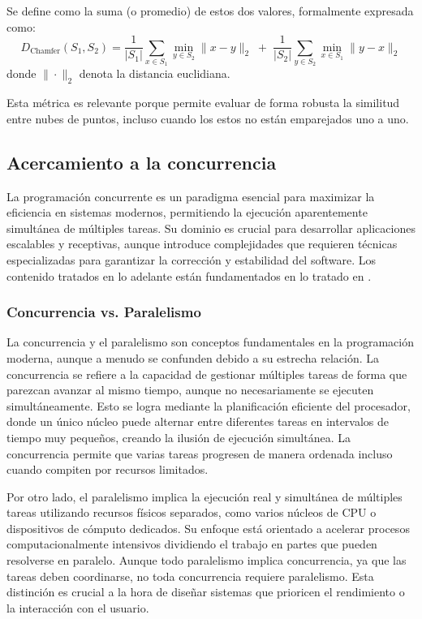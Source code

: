 Se define como la suma (o promedio) de estos dos valores, formalmente expresada como:
\[
D_{\mathrm{Chamfer}}(S_1, S_2) = \frac{1}{|S_1|} \sum_{x \in S_1} \min_{y \in S_2} \|x - y\|_2 \;+\; \frac{1}{|S_2|} \sum_{y \in S_2} \min_{x \in S_1} \|y - x\|_2
\]
donde \(\|\cdot\|_2\) denota la distancia euclidiana.

Esta métrica es relevante porque permite evaluar de forma robusta la similitud entre nubes de puntos, incluso cuando los estos no están emparejados uno a uno. 

\subsection{Acercamiento a la concurrencia}
La programación concurrente es un paradigma esencial para maximizar la eficiencia en sistemas modernos, permitiendo la ejecución aparentemente simultánea de múltiples tareas. Su dominio es crucial para desarrollar aplicaciones escalables y receptivas, aunque introduce complejidades que requieren técnicas especializadas para garantizar la corrección y estabilidad del software. Los contenido tratados en lo adelante están fundamentados en lo tratado en \cite{tanenbaum2008modern}.

\subsubsection{Concurrencia vs. Paralelismo}
La concurrencia y el paralelismo son conceptos fundamentales en la programación moderna, aunque a menudo se confunden debido a su estrecha relación. La concurrencia se refiere a la capacidad de gestionar múltiples tareas de forma que parezcan avanzar al mismo tiempo, aunque no necesariamente se ejecuten simultáneamente. Esto se logra mediante la planificación eficiente del procesador, donde un único núcleo puede alternar entre diferentes tareas en intervalos de tiempo muy pequeños, creando la ilusión de ejecución simultánea. La concurrencia permite que varias tareas progresen de manera ordenada incluso cuando compiten por recursos limitados.

Por otro lado, el paralelismo implica la ejecución real y simultánea de múltiples tareas utilizando recursos físicos separados, como varios núcleos de CPU o dispositivos de cómputo dedicados. Su enfoque está orientado a acelerar procesos computacionalmente intensivos dividiendo el trabajo en partes que pueden resolverse en paralelo. Aunque todo paralelismo implica concurrencia, ya que las tareas deben coordinarse, no toda concurrencia requiere paralelismo. Esta distinción es crucial a la hora de diseñar sistemas que prioricen el rendimiento o la interacción con el usuario.

